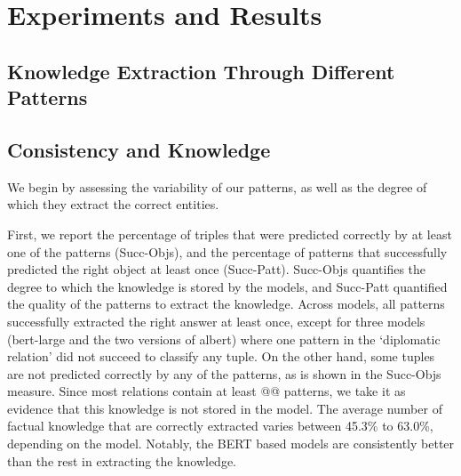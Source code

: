 \section{Experiments and Results}
\label{sec:experiments}






\subsection{Knowledge Extraction Through Different Patterns}


\subsection{Consistency and Knowledge}


We begin by assessing the variability of our patterns, as well as the degree of which they extract the correct entities.

First, we report the percentage of triples that were predicted correctly by at least one of the patterns (Succ-Objs), and the percentage of patterns that successfully predicted the right object at least once (Succ-Patt). Succ-Objs quantifies the degree to which the knowledge is stored by the models, and Succ-Patt quantified the quality of the patterns to extract the knowledge.
Across models, all patterns successfully extracted the right
answer at least once, except for three models (bert-large and the two versions of albert) where one pattern in the `diplomatic relation'  did not succeed to classify any tuple.
On the other hand, some tuples are not predicted correctly by any of the patterns, as is shown in the Succ-Objs measure. Since most relations contain at least @@ patterns, we take it as evidence that this knowledge is not stored in the model. 
The average number of factual knowledge that are correctly extracted varies between 45.3\% to 63.0\%, depending on the model. Notably, the BERT based models are consistently better than the rest in extracting the knowledge. 

